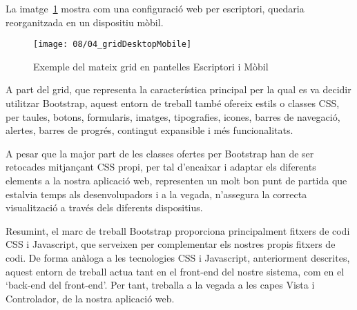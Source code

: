     La imatge~\ref{img:gridAdapted} mostra com una configuració web per escriptori, quedaria re\-or\-ga\-nit\-za\-da en un dispositiu mòbil.

    \begin{figure}[h]
        \texttt{[image: 08/04\_gridDesktopMobile]}
        \centering
        \caption{Exemple del mateix grid en pantelles Escriptori i Mòbil}\label{img:gridAdapted}
    \end{figure}

    A part del grid, que representa la característica principal per la qual es va decidir utilitzar Bootstrap, aquest entorn de treball també ofereix estils o classes CSS, per taules, botons, formularis, imatges, tipografies, icones, barres de navegació, alertes, barres de progrés, contingut expansible i més funcionalitats.

    A pesar que la major part de les classes ofertes per Bootstrap han de ser retocades mitjançant CSS propi, per tal d'encaixar i adaptar els diferents elements a la nostra aplicació web, representen un molt bon punt de partida que estalvia temps als desenvolupadors i a la vegada, n'assegura la correcta visualització a través dels diferents dispositius.

    Resumint, el marc de treball Bootstrap proporciona principalment fitxers de codi CSS i Javascript, que serveixen per complementar els nostres propis fitxers de codi. De forma anàloga a les tecnologies CSS i Javascript, anteriorment descrites, aquest entorn de treball actua tant en el front-end del nostre sistema, com en el `back-end del front-end’. Per tant, treballa a la vegada a les capes Vista i Controlador, de la nostra aplicació web.

